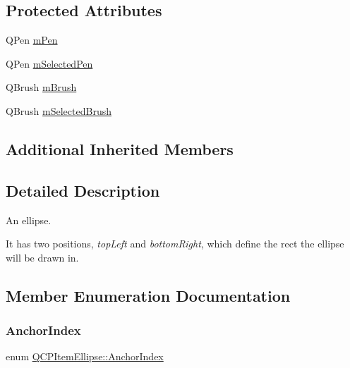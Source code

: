 \subsection*{Protected Attributes}
\begin{DoxyCompactItemize}
\item 
Q\+Pen \hyperlink{class_q_c_p_item_ellipse_a16ad9389acf028a7e4ac8fd7a550b2e4}{m\+Pen}
\item 
Q\+Pen \hyperlink{class_q_c_p_item_ellipse_a57b047abfce6f1a84ed46ca668c90e21}{m\+Selected\+Pen}
\item 
Q\+Brush \hyperlink{class_q_c_p_item_ellipse_a6fa59478cd3ad1b10e6c1f6cedc84bd6}{m\+Brush}
\item 
Q\+Brush \hyperlink{class_q_c_p_item_ellipse_a2e49d5547478aa36910ed8a2dcc8a5c0}{m\+Selected\+Brush}
\end{DoxyCompactItemize}
\subsection*{Additional Inherited Members}


\subsection{Detailed Description}
An ellipse. 

 It has two positions, {\itshape top\+Left} and {\itshape bottom\+Right}, which define the rect the ellipse will be drawn in. 

\subsection{Member Enumeration Documentation}
\mbox{\label{class_q_c_p_item_ellipse_a415009889543169f35b70795f415e45e}} 
\subsubsection{\texorpdfstring{Anchor\+Index}{AnchorIndex}}
{\footnotesize\ttfamily enum \hyperlink{class_q_c_p_item_ellipse_a415009889543169f35b70795f415e45e}{Q\+C\+P\+Item\+Ellipse\+::\+Anchor\+Index}\hspace{0.3cm}{\ttfamily [protected]}}

